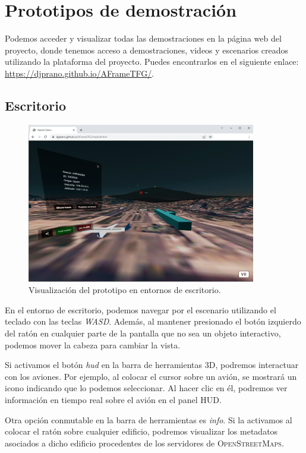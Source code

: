 \documentclass[a4paper, 11pt]{book}
\begin{document}
\section{Prototipos de demostración}
Podemos acceder y visualizar todas las demostraciones en la página web del proyecto, donde tenemos acceso a demostraciones, videos y escenarios creados utilizando la plataforma del proyecto. Puedes encontrarlos en el siguiente enlace: \url{https://djprano.github.io/AFrameTFG/}.
\subsection{Escritorio}
\begin{figure}[H]
	\centering
	\includegraphics[width=10cm, keepaspectratio]{img/desktop_demo.png}
	\caption{Visualización del prototipo en entornos de escritorio.}
	\label{fig:desktop_demo}
\end{figure}
En el entorno de escritorio, podemos navegar por el escenario utilizando el teclado con las teclas \emph{WASD}. Además, al mantener presionado el botón izquierdo del ratón en cualquier parte de la pantalla que no sea un objeto interactivo, podemos mover la cabeza para cambiar la vista.

Si activamos el botón \emph{hud} en la barra de herramientas \textsc{3D}, podremos interactuar con los aviones. Por ejemplo, al colocar el cursor sobre un avión, se mostrará un icono indicando que lo podemos seleccionar. Al hacer clic en él, podremos ver información en tiempo real sobre el avión en el panel \textsc{HUD}.

Otra opción conmutable en la barra de herramientas es \emph{info}. Si la activamos al colocar el ratón sobre cualquier edificio, podremos visualizar los metadatos asociados a dicho edificio procedentes de los servidores de \textsc{OpenStreetMaps}.
\end{document}
